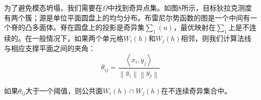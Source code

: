 为了避免模态坍塌，我们需要在$\Omega$中找到奇异点集。如图8所示，目标狄拉克测度有两个簇；源是单位平面圆盘上的均匀分布。布雷尼尔势函数的图是一个中间有一个脊的凸多面体。脊在圆盘上的投影是奇异集$\sum_1(u)$，最优映射在$\sum_1$上是不连续的。在一般情况下，如果两个单元格$W_i(h)$和$W_j(h)$相邻，则我们计算法线与相应支撑平面之间的夹角：
\begin{equation*}
	\theta _{ij} =\frac{\left \langle x_i,y_j \right \rangle }{\left \| y_i \right \| \left \| y_j \right \| } 
\end{equation*}

如果$\theta _{ij}$大于一个阈值，则公共面$W_i(h) \cap W_j(h)$在不连续奇异集合中。